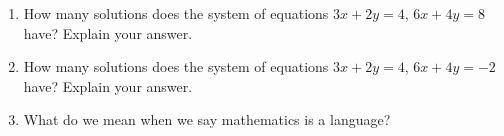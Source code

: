 \begin{enumerate}
\item How many solutions does the  system of equations  $3x + 2y  = 4$, $6x + 4y = 8$  have?  Explain your answer.
\item How many solutions does the  system of equations  $3x + 2y  = 4$, $6x + 4y = -2$  have?  Explain your answer.
\item What do we mean when we say mathematics is a language?
\end{enumerate}